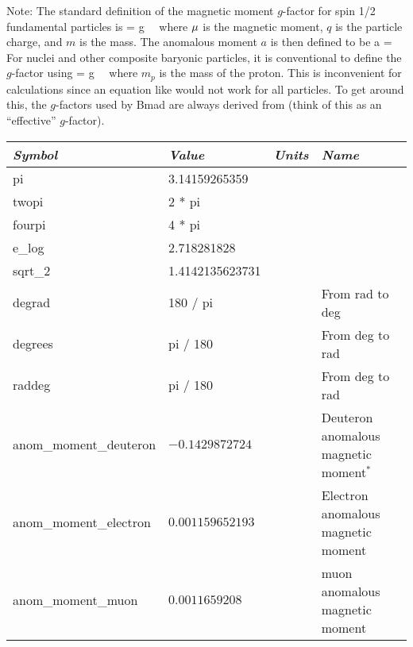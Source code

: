 {{{Note: The standard definition of the magnetic moment $g$-factor for spin 1/2 fundamental particles is
\Begineq
  \Bf\mu = g \,  \, \bfS
  \label{mgq2m}
\Endeq
where ${\bf \mu}$ is the magnetic moment, $q$ is the particle charge, and $m$ is the mass. The
anomalous moment $a$ is then defined to be
\Begineq
  a = 
\Endeq
For nuclei and other composite baryonic particles, it is conventional to define the $g$-factor using
\Begineq
  \Bf\mu = g \,  \, \bfS
  \label{mgq2m2}
\Endeq
where $m_p$ is the mass of the proton. This is inconvenient for calculations since an equation like
 would not work for all particles. To get around this, the $g$-factors used by Bmad are
always derived from  (think of this as an ``effective'' $g$-factor).

\begin{table}[h]
\centering
\begin{tabular}{llll} \toprule
  {\em Symbol}          & {\em Value}              & {\em Units} &  {\em Name}           \\ \midrule
  pi                    & 3.14159265359            &             &                       \\
  twopi                 & 2 * pi                   &             &                       \\
  fourpi                & 4 * pi                   &             &                       \\
  e_log                 & 2.718281828              &             &                       \\
  sqrt_2                & 1.4142135623731          &             &                       \\
  degrad                & 180 / pi                 &             & From rad to deg       \\
  degrees               & pi / 180                 &             & From deg to rad       \\
  raddeg                & pi / 180                 &             & From deg to rad       \\
  anom_moment_deuteron  & $-0.1429872724$          &             & Deuteron anomalous magnetic moment$^*$ \\
  anom_moment_electron  & $0.001159652193$         &             & Electron anomalous magnetic moment     \\
  anom_moment_muon      & $0.0011659208$           &             & muon anomalous magnetic moment         \\

\end{tabular}
\end{table}}}}
